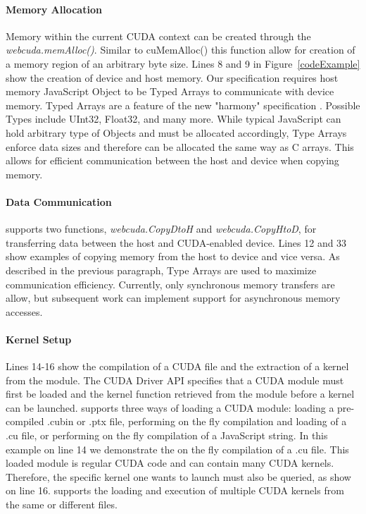 \paragraph{Memory Allocation} Memory within the current CUDA context can be
created through the \textit{webcuda.memAlloc()}. Similar to cuMemAlloc() this
function allow for creation of a memory region of an arbitrary byte size. Lines
8 and 9 in Figure~\ref{codeExample} show the creation of device and host memory.
Our specification requires host memory JavaScript Object to be Typed Arrays
\cite{typedarray} to communicate with device memory. Typed Arrays are a feature
of the new "harmony" specification \cite{harmony}. Possible Types include
UInt32, Float32, and many more. While typical JavaScript can hold arbitrary type
of Objects and must be allocated accordingly, Type Arrays enforce data sizes and
therefore can be allocated the same way as C arrays. This allows for efficient
communication between the host and device when copying memory.


\paragraph{Data Communication} \name supports two functions,
\textit{webcuda.CopyDtoH} and \textit{webcuda.CopyHtoD}, for transferring 
data between the host and CUDA-enabled device. Lines 12 and 33 show examples of copying
memory from the host to device and vice versa. As described in the previous
paragraph, Type Arrays are used to maximize communication efficiency. Currently,
only synchronous memory transfers are allow, but subsequent work can implement
support for asynchronous memory accesses.

\paragraph{Kernel Setup}
Lines 14-16 show the compilation of a CUDA file and the extraction of a kernel
from the module. The CUDA Driver API specifies that a CUDA module must first be
loaded and the kernel function retrieved from the module before a kernel can be
launched. \name supports three ways of loading a CUDA module: loading a
pre-compiled .cubin or .ptx file, performing on the fly compilation and loading
of a .cu file, or performing on the fly compilation of a JavaScript string. In
this example on line 14 we demonstrate the on the fly compilation of a .cu
file. This loaded module is regular CUDA code and can contain many CUDA kernels.
Therefore, the specific kernel one wants to launch must also be queried, as show
on line 16. \name supports the loading and execution of multiple CUDA kernels
from the same or different files.

